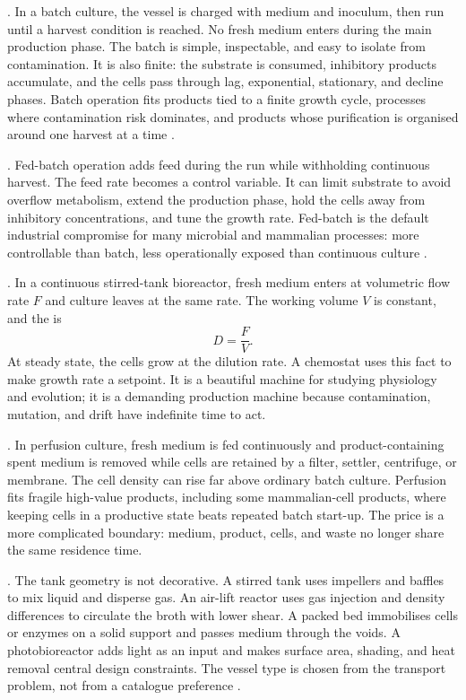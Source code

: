 

. In a batch culture, the vessel is charged
with medium and inoculum, then run until a harvest condition is reached.
No fresh medium enters during the main production phase. The batch is
simple, inspectable, and easy to isolate from contamination. It is also
finite: the substrate is consumed, inhibitory products accumulate, and
the cells pass through lag, exponential, stationary, and decline phases.
Batch operation fits products tied to a finite growth cycle, processes
where contamination risk dominates, and products whose purification is
organised around one harvest at a time
\cite[ch.~3]{text:v6c10-doran-bioprocess-2013}.

. Fed-batch operation adds feed during the
run while withholding continuous harvest. The feed rate becomes a
control variable. It can limit substrate to avoid overflow metabolism,
extend the production phase, hold the cells away from inhibitory
concentrations, and tune the growth rate. Fed-batch is the default
industrial compromise for many microbial and mammalian processes:
more controllable than batch, less operationally exposed than continuous
culture \cite[ch.~12]{text:stanbury-fermentation}.

. In a continuous stirred-tank bioreactor,
fresh medium enters at volumetric flow rate $F$ and culture leaves at
the same rate. The working volume $V$ is constant, and the
 is
\[
D = \frac{F}{V}.
\]
At steady state, the cells grow at the dilution rate. A chemostat uses
this fact to make growth rate a setpoint. It is a beautiful machine for
studying physiology and evolution; it is a demanding production machine
because contamination, mutation, and drift have indefinite time to act.

. In perfusion culture, fresh medium is
fed continuously and product-containing spent medium is removed while
cells are retained by a filter, settler, centrifuge, or membrane. The
cell density can rise far above ordinary batch culture. Perfusion fits
fragile high-value products, including some mammalian-cell products,
where keeping cells in a productive state beats repeated batch start-up.
The price is a more complicated boundary: medium, product, cells, and
waste no longer share the same residence time.

. The tank geometry is not decorative. A stirred tank
uses impellers and baffles to mix liquid and disperse gas. An air-lift
reactor uses gas injection and density differences to circulate the
broth with lower shear. A packed bed immobilises cells or enzymes on a
solid support and passes medium through the voids. A photobioreactor
adds light as an input and makes surface area, shading, and heat removal
central design constraints. The vessel type is chosen from the transport
problem, not from a catalogue preference
\cite[ch.~8]{text:v6c10-shuler-bioprocess-2017}.

